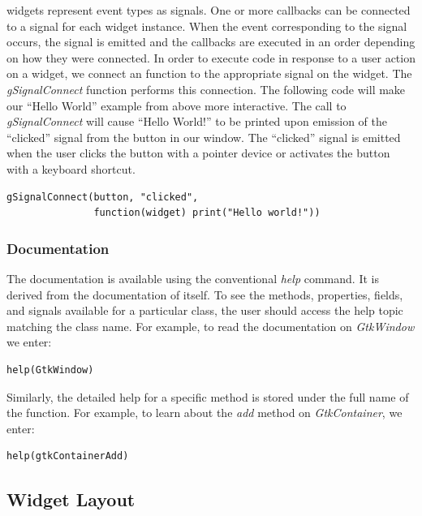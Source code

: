 \documentclass[article]{jss}
\begin{document}
 widgets represent event types as signals. One or more
callbacks can be connected to a signal for each widget instance. When
the event corresponding to the signal occurs, the signal is emitted
and the callbacks are executed in an order depending on how they were
connected. In order to execute  code in response to a user
action on a widget, we connect an  function to the
appropriate signal on the widget.  The \emph{gSignalConnect} function
performs this connection. The following code will make our ``Hello
World'' example from above more interactive.  The call to
\emph{gSignalConnect} will cause ``Hello World!'' to be printed upon
emission of the ``clicked'' signal from the button in our window.  The
``clicked'' signal is emitted when the user clicks the button with a
pointer device or activates the button with a keyboard shortcut.
\begin{verbatim}
gSignalConnect(button, "clicked", 
               function(widget) print("Hello world!"))
\end{verbatim}

\subsubsection{Documentation}

The  documentation is available using the conventional
\emph{help} command. It is derived from the documentation of
 itself.
To see the methods, properties, fields, and signals available
for a particular class, the user should access the help topic matching
the class name.
For example, to read the documentation on \emph{GtkWindow} we enter:
\begin{verbatim}
help(GtkWindow)
\end{verbatim}

Similarly, the detailed help for a specific method is stored under the
full name of the function. For example, to learn about the \emph{add}
method on \emph{GtkContainer}, we enter:
\begin{verbatim}
help(gtkContainerAdd)
\end{verbatim}

\subsection{Widget Layout}\label{sec:layout}
\end{document}
